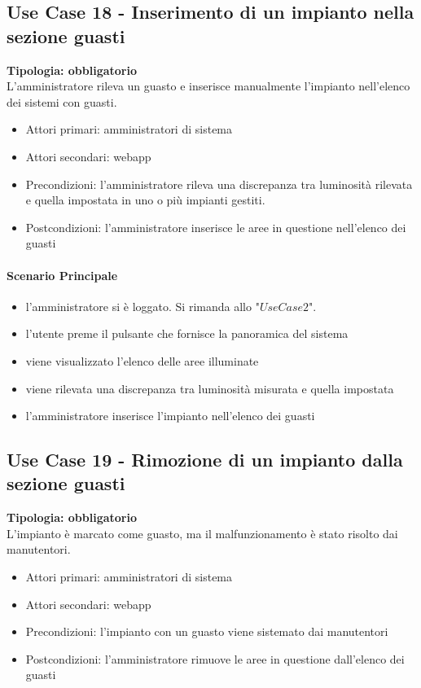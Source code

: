 \documentclass[12pt]{article}
\begin{document}
\subsection{Use Case 18 - Inserimento di un impianto nella sezione guasti}
\textbf{Tipologia: obbligatorio} \\
L'amministratore rileva un guasto e inserisce manualmente l'impianto nell'elenco dei sistemi con guasti.
\begin{itemize}
	\item Attori primari: amministratori di sistema
	\item Attori secondari: webapp
	\item Precondizioni: l'amministratore rileva una discrepanza tra luminosità rilevata e quella impostata in uno o più impianti gestiti.
	\item Postcondizioni: l'amministratore inserisce le aree in questione nell'elenco dei guasti
\end{itemize}
\paragraph{Scenario Principale}
\begin{itemize}
	\item l'amministratore si è loggato. Si rimanda allo "$Use Case 2$".
	\item l'utente preme il pulsante che fornisce la panoramica del sistema
	\item viene visualizzato l'elenco delle aree illuminate
	\item viene rilevata una discrepanza tra luminosità misurata e quella impostata
	\item l'amministratore inserisce l'impianto nell'elenco dei guasti
\end{itemize}

\subsection{Use Case 19 - Rimozione di un impianto dalla sezione guasti}
\textbf{Tipologia: obbligatorio} \\
L'impianto è marcato come guasto, ma il malfunzionamento è stato risolto dai manutentori.
\begin{itemize}
	\item Attori primari: amministratori di sistema
	\item Attori secondari: webapp
	\item Precondizioni: l'impianto con un guasto viene sistemato dai manutentori
	\item Postcondizioni: l'amministratore rimuove le aree in questione dall'elenco dei guasti
\end{itemize}
\end{document}

